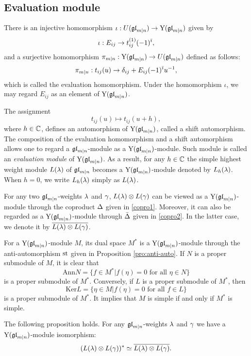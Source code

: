 \documentclass[12pt]{amsart}
\begin{document}
\subsection{Evaluation module}
There is an injective homomorphism $\iota:U(\mathfrak{gl}_{m|n})\rightarrow {\rm Y}(\mathfrak{gl}_{m|n})$ given by
\[
\iota: E_{ij}\rightarrow t_{ij}^{(1)}(-1)^{\bar{\imath}},
\]
and a surjective homomorphism $\pi_{m|n}:{\rm Y}(\mathfrak{gl}_{m|n})\rightarrow U(\mathfrak{gl}_{m|n})$ defined as follows:
\[
\pi_{m|n}: t_{ij}(u)\rightarrow \delta_{ij}+E_{ij}(-1)^{\bar{\imath}}u^{-1},
\]
which is called the evaluation homomorphism.
Under the homomorphism $\iota$, we may regard $E_{ij}$ as an element of ${\rm Y}(\mathfrak{gl}_{m|n})$.


The assignment
\[
t_{ij}(u)\mapsto t_{ij}(u+h),
\]
where $h\in \mathbb{C}$, defines an automorphism of ${\rm Y}(\mathfrak{gl}_{m|n})$, called a shift automorphism.
The composition of the evaluation homomorphism and a shift automorphism allows one to regard a $\mathfrak{gl}_{m|n}$-module as a ${\rm Y}(\mathfrak{gl}_{m|n})$-module.
Such module is called an \emph{evaluation module} of ${\rm Y}(\mathfrak{gl}_{m|n})$. As a result, for any $h\in \mathbb{C}$ the simple highest weight module $L(\lambda)$ of $\mathfrak{gl}_{m|n}$ becomes a ${\rm Y}(\mathfrak{gl}_{m|n})$-module denoted by $L_h(\lambda)$. When $h=0$, we write $L_h(\lambda)$ simply as $L(\lambda)$.

For any two $\mathfrak{gl}_{m|n}$-weights $\lambda$ and $\gamma$, $L(\lambda)\otimes L(\gamma)$ can be viewed as a ${\rm Y}(\mathfrak{gl}_{m|n})$-module through the coproduct $\Delta$ given in \eqref{copro1}. Moreover, it can also be regarded as a ${\rm Y}(\mathfrak{gl}_{m|n})$-module through $\bar{\Delta}$ given in \eqref{copro2}. In the latter case, we denote it by
$\overline{L(\lambda)\otimes L(\gamma)}$.

For a ${\rm Y}(\mathfrak{gl}_{m|n})$-module $M$, its dual space $M^*$ is a ${\rm Y}(\mathfrak{gl}_{m|n})$-module through the anti-automorphism ${\rm st}$ given in Proposition \ref{pro:anti-auto}.
If $N$ is a proper submodule of $M$, it is clear that
\[
\text{Ann}{N}=\{f\in M^*|f(\eta)=0 \text{ for all } \eta\in N\}
\]
is a proper submodule of $M^*$.
Conversely, if $L$ is a proper submodule of $M^*$, then
\[
\text{Ker}{L}=\{\eta\in M|f(\eta)=0 \text{ for all }f\in L\}
\]
is a  proper submodule of $M^*$.
It implies that $M$ is simple if and only if $M^*$ is simple.


 The following proposition holds.
\bpr\label{pro:dual} For any  $\mathfrak{gl}_{m|n}$-weights $\lambda$ and $\gamma$
we have a ${\rm Y}(\mathfrak{gl}_{m|n})$-module  isomorphism:
\[(L(\lambda)\otimes L(\gamma))^*\simeq
\overline{L(\lambda)\otimes L(\gamma)}.
\]
\epr
\end{document}
